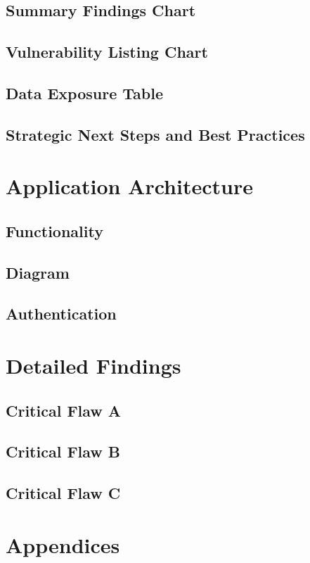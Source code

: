 \documentclass[11pt,a4paper]{article}
\begin{document}
\subsection{Summary Findings Chart}
\lipsum
\subsection{Vulnerability Listing Chart}
\lipsum
\subsection{Data Exposure Table}
\lipsum
\subsection{Strategic Next Steps and Best Practices}
\lipsum

\section{Application Architecture}
\subsection{Functionality}
\lipsum
\subsection{Diagram}
\lipsum
\subsection{Authentication}
\lipsum

\section{Detailed Findings}
\subsection{Critical Flaw A}
\lipsum
\subsection{Critical Flaw B}
\lipsum
\subsection{Critical Flaw C}
\lipsum

\section{Appendices}
\end{document}
